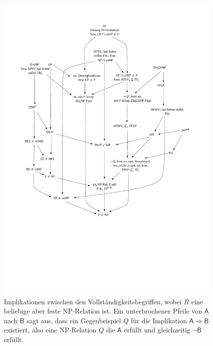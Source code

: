 \begin{figure}[tb]
    \centering\includegraphics[page=2]{figures.pdf}
    \caption{Implikationen zwischen den  Vollständigkeitsbegriffen, wobei $R$ eine beliebige aber feste NP-Relation ist. Ein unterbrochener Pfeile von $\mathsf{A}$ nach $\mathsf{B}$ sagt aus, dass ein Gegenbeispiel $Q$ für die Implikation $\mathsf{A\Rightarrow B}$ existiert, also eine NP-Relation $Q$ die $\mathsf{A}$ erfüllt und gleichzeitig $\neg\mathsf{B}$ erfüllt.}\label{fig:reduktionsbegriffe}
\end{figure}

